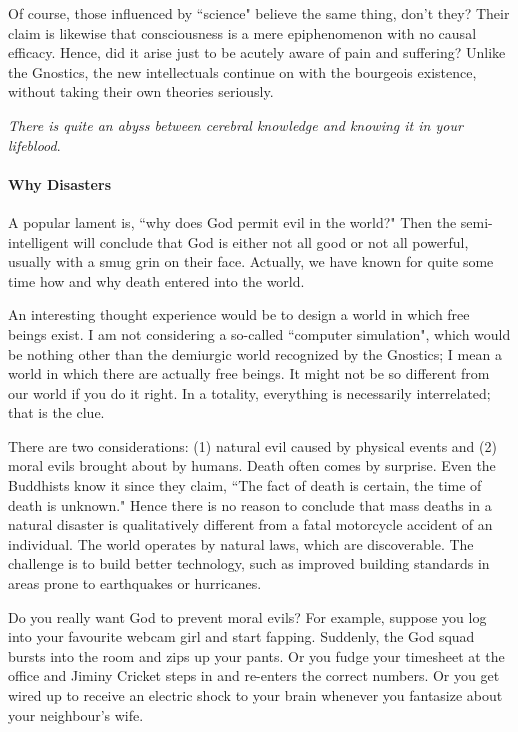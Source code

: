 Of course, those influenced by ``science" believe the same thing, don't they? Their claim is likewise that consciousness is a mere epiphenomenon with no causal efficacy. Hence, did it arise just to be acutely aware of pain and suffering? Unlike the Gnostics, the new intellectuals continue on with the bourgeois existence, without taking their own theories seriously.

\emph{There is quite an abyss between cerebral knowledge and knowing it in your lifeblood}.

\paragraph{Why Disasters}
A popular lament is, ``why does God permit evil in the world?" Then the semi-intelligent will conclude that God is either not all good or not all powerful, usually with a smug grin on their face. Actually, we have known for quite some time how and why death entered into the world.

An interesting thought experience would be to design a world in which free beings exist. I am not considering a so-called ``computer simulation", which would be nothing other than the demiurgic world recognized by the Gnostics; I mean a world in which there are actually free beings. It might not be so different from our world if you do it right. In a totality, everything is necessarily interrelated; that is the clue.

There are two considerations: (1) natural evil caused by physical events and (2) moral evils brought about by humans. Death often comes by surprise. Even the Buddhists know it since they claim, ``The fact of death is certain, the time of death is unknown." Hence there is no reason to conclude that mass deaths in a natural disaster is qualitatively different from a fatal motorcycle accident of an individual. The world operates by natural laws, which are discoverable. The challenge is to build better technology, such as improved building standards in areas prone to earthquakes or hurricanes.

Do you really want God to prevent moral evils? For example, suppose you log into your favourite webcam girl and start fapping. Suddenly, the God squad bursts into the room and zips up your pants. Or you fudge your timesheet at the office and Jiminy Cricket steps in and re-enters the correct numbers. Or you get wired up to receive an electric shock to your brain whenever you fantasize about your neighbour's wife.

